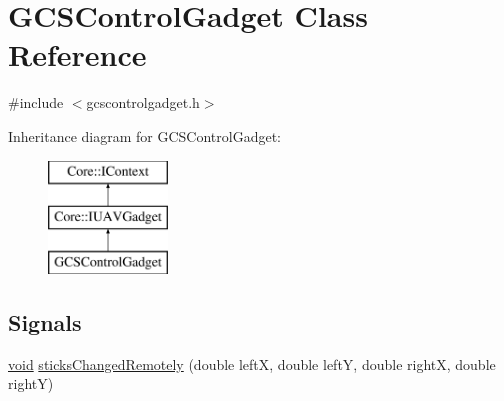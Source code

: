\hypertarget{class_g_c_s_control_gadget}{\section{\-G\-C\-S\-Control\-Gadget \-Class \-Reference}
\label{class_g_c_s_control_gadget}
}


{\ttfamily \#include $<$gcscontrolgadget.\-h$>$}

\-Inheritance diagram for \-G\-C\-S\-Control\-Gadget\-:\begin{figure}[H]
\begin{center}
\leavevmode
\includegraphics[height=3.000000cm]{class_g_c_s_control_gadget}
\end{center}
\end{figure}
\subsection*{\-Signals}
\begin{DoxyCompactItemize}
\item 
\hyperlink{group___u_a_v_objects_plugin_ga444cf2ff3f0ecbe028adce838d373f5c}{void} \hyperlink{group___g_c_s_control_gadget_plugin_gadf32420d5e7ad8ff1d32752209406e28}{sticks\-Changed\-Remotely} (double left\-X, double left\-Y, double right\-X, double right\-Y)
\end{DoxyCompactItemize}
